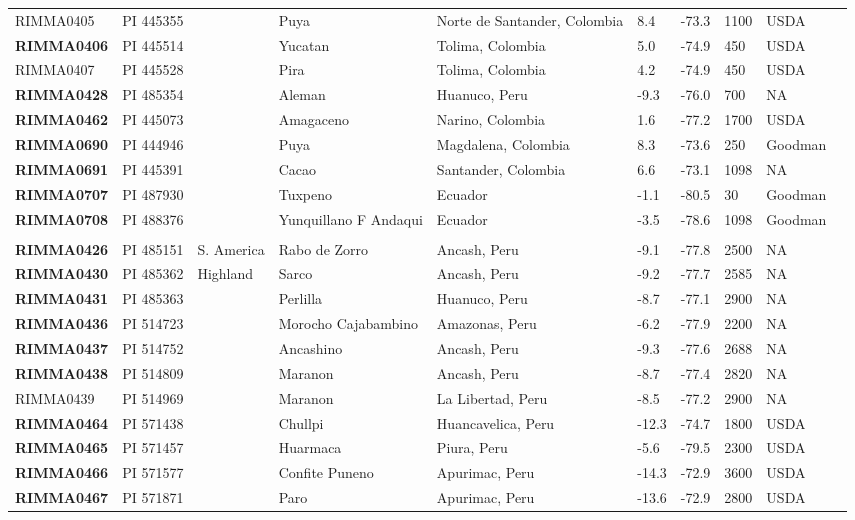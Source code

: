 \begin{table}[h]
\begin{center}
{\begin{tabular}{llllllllll}
RIMMA0405	&	PI 445355	&		&	Puya	&	Norte de Santander, Colombia	&	8.4 	&	-73.3 	&	1100	&	USDA	\\
{\bf RIMMA0406}	&	PI 445514	&		&	Yucatan	&	Tolima, Colombia	&	5.0 	&	-74.9 	&	450	&	USDA	\\
RIMMA0407	&	PI 445528	&		&	Pira	&	Tolima, Colombia	&	4.2 	&	-74.9 	&	450	&	USDA	\\
{\bf RIMMA0428}	&	PI 485354	&		&	Aleman	&	Huanuco, Peru	&	-9.3 	&	-76.0 	&	700	&	NA	\\
{\bf RIMMA0462}	&	PI 445073	&		&	Amagaceno	&	Narino, Colombia	&	1.6 	&	-77.2 	&	1700	&	USDA	\\
{\bf RIMMA0690}	&	PI 444946	&		&	Puya	&	Magdalena, Colombia	&	8.3 	&	-73.6 	&	250	&	Goodman	\\
{\bf RIMMA0691}	&	PI 445391	&		&	Cacao	&	Santander, Colombia	&	6.6 	&	-73.1 	&	1098	&	NA	\\
{\bf RIMMA0707}	&	PI 487930	&		&	Tuxpeno	&	Ecuador	&	-1.1 	&	-80.5 	&	30	&	Goodman	\\
{\bf RIMMA0708}	&	PI 488376	&		&	Yunquillano F Andaqui	&	Ecuador	&	-3.5 	&	-78.6 	&	1098	&	Goodman	\\
	\hline 
	& & & \\[-4mm] 
{\bf RIMMA0426}	&	PI 485151	&	S. America	&	Rabo de Zorro	&	Ancash, Peru	&	-9.1 	&	-77.8 	&	2500	&	NA	\\
{\bf RIMMA0430}	&	PI 485362	&	Highland	&	Sarco	&	Ancash, Peru	&	-9.2 	&	-77.7 	&	2585	&	NA	\\
{\bf RIMMA0431}	&	PI 485363	&	 	&	Perlilla	&	Huanuco, Peru	&	-8.7 	&	-77.1 	&	2900	&	NA	\\
{\bf RIMMA0436}	&	PI 514723	&		&	Morocho Cajabambino	&	Amazonas, Peru	&	-6.2 	&	-77.9 	&	2200	&	NA	\\
{\bf RIMMA0437}	&	PI 514752	&		&	Ancashino	&	Ancash, Peru	&	-9.3 	&	-77.6 	&	2688	&	NA	\\
{\bf RIMMA0438}	&	PI 514809	&		&	Maranon	&	Ancash, Peru	&	-8.7 	&	-77.4 	&	2820	&	NA	\\
RIMMA0439	&	PI 514969	&		&	Maranon	&	La Libertad, Peru	&	-8.5 	&	-77.2 	&	2900	&	NA	\\
{\bf RIMMA0464}	&	PI 571438	&		&	Chullpi	&	Huancavelica, Peru	&	-12.3 	&	-74.7 	&	1800	&	USDA	\\
{\bf RIMMA0465}	&	PI 571457	&		&	Huarmaca	&	Piura, Peru	&	-5.6 	&	-79.5 	&	2300	&	USDA	\\
{\bf RIMMA0466}	&	PI 571577	&		&	Confite Puneno	&	Apurimac, Peru	&	-14.3 	&	-72.9 	&	3600	&	USDA	\\
{\bf RIMMA0467}	&	PI 571871	&		&	Paro	&	Apurimac, Peru	&	-13.6 	&	-72.9 	&	2800	&	USDA	\\

\end{tabular}}
\end{center}
\end{table}

